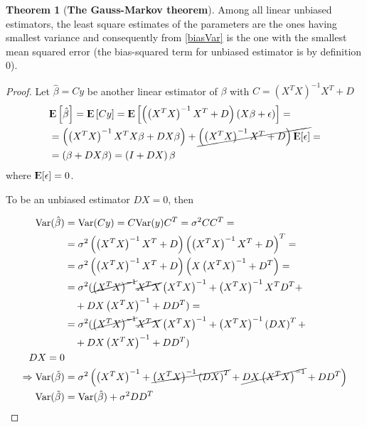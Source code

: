 \documentclass[12pt, letterpaper]{article}
\theoremstyle{definition}
\newcommand{\E}{{\rm I\kern-.3em E}}
\newcommand{\Var}{\mathrm{Var}}
\newtheorem{theorem}{Theorem}
\begin{document}
\begin{theorem}[\textbf{The Gauss-Markov theorem}]
Among all linear unbiased estimators, the least square estimates of the parameters are the ones having smallest variance and consequently from \ref{biasVar} is the one with the smallest mean squared error (the bias-squared term for unbiased estimator is by definition $0$).
\begin{proof}
Let $\hat{\beta} = Cy$ be another linear estimator of $\beta$ with $C = (X^TX)^{-1}X^T+D$
\begin{align}
&\E\left[ \hat{\beta} \right] = \E\left[ Cy \right] = \E\left[\left(\left(X^TX\right)^{-1}X^T+D\right) \left( X\beta+\epsilon\right)\right] =\\
& = \left(\left(X^TX\right)^{-1}X^T X\beta +DX\beta\right) +\cancel{\left(\left(X^TX\right)^{-1}X^T  +D\right) \E[\epsilon]}=\\
& = \left(\beta +DX\beta\right) = \left( I +DX\right) \beta\\
\end{align}
where $ \E[\epsilon] = 0$.

To be an unbiased estimator $DX = 0$, then

\begin{equation}
\begin{aligned}
\Var(\hat{\beta}) &= \Var(Cy) = C\Var(y) C^T = \sigma^2 CC^T = \\
&= \sigma^2 \left( \left(X^T X\right)^{-1}X^T +D \right)    \left( \left(X^T X\right)^{-1}X^T+D\right)^T =\\
&= \sigma^2 \left( \left(X^T X\right)^{-1}X^T +D \right)    \left( X \left(X^TX\right)^{-1} + D^T \right)  =\\
&= \sigma^2 (  \cancel{\left(X^TX\right)^{-1}}\cancel{X^T X}   \left(X^TX\right)^{-1} +  \left(X^T X\right)^{-1}X^TD^T                          +\\
&\quad + D X \left(X^TX\right)^{-1} +DD^T) =\\
&= \sigma^2 (  \cancel{\left(X^TX\right)^{-1}}\cancel{X^T X}   \left(X^TX\right)^{-1} +  \left(X^T X\right)^{-1}\left( DX \right)^T                          +\\
&\quad + D X \left(X^TX\right)^{-1} +DD^T) \\
DX=0 \\\Rightarrow \Var(\tilde{\beta}) &= \sigma^2 \left( \left(X^TX\right)^{-1} +  \cancel{\left(X^T X\right)^{-1}\left( DX \right)^T }  + \cancel{D X \left(X^TX\right)^{-1} }+DD^T\right) \\
\Var(\tilde{\beta}) &= \Var(\hat{\beta})  + \sigma^2DD^T
\end{aligned}
\end{equation}

\end{proof}
\end{theorem}
\end{document}
